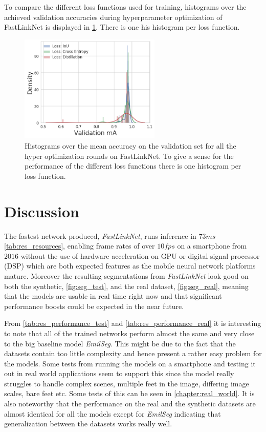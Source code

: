 \documentclass{kththesis}
\begin{document}
To compare the different loss functions used for training, histograms over the achieved
validation accuracies during hyperparameter optimization of FastLinkNet is
displayed in \cref{fig:loss_fn}. There is one his histogram per loss function.

\begin{figure}[h]
  \centering
  \includegraphics[width=0.6\textwidth]{Loss_fn_hist_FastLinkNet3}
  \caption{Histograms over the mean accuracy on the validation set for all the
    hyper optimization rounds on FastLinkNet. To give a sense for the
    performance of the different loss functions there is one histogram per loss
    function.}
  \label{fig:loss_fn}
\end{figure}

\chapter{Discussion}
The fastest network produced, \textit{FastLinkNet}, runs inference in \(73 ms\)
\cref{tab:res_resources}, enabling frame rates of over \(10fps\) on a smartphone
from \(2016\) without the use of hardware acceleration on GPU or digital signal
processor (DSP) which are both
expected features as the mobile neural network platforms mature.
Moreover the resulting segmentations from \textit{FastLinkNet} look good on both
the synthetic, \cref{fig:seg_test}, and the real dataset, \cref{fig:seg_real}, meaning that
the models are usable in real time right now and that significant performance
boosts could be expected in the near future.

From \cref{tab:res_performance_test} and \cref{tab:res_performance_real} it is interesting to note that all of the
trained networks perform almost the same and very close to the big baseline
model \textit{EmilSeg}. This might be due to the fact that the datasets contain
too little complexity and hence present a rather easy problem for
the models. Some tests from running the models on a smartphone and testing it
out in real world applications seem to support this since the model really
struggles to handle complex scenes, multiple feet in the image, differing image
scales, bare feet etc. Some tests of this can be seen in \cref{chapter:real_world}.
It is also noteworthy that the performance on the real and the synthetic
datasets are almost identical for all the models except for \textit{EmilSeg}
indicating that generalization between the datasets works really well.
\end{document}
